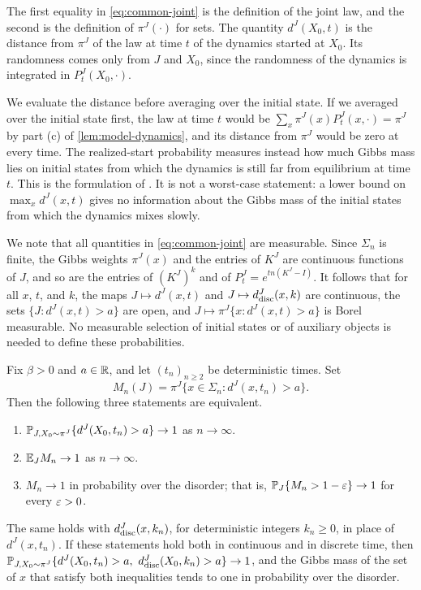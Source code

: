 The first equality in \eqref{eq:common-joint} is the definition of the joint law, and the second is the definition of $\pi^J(\cdot)$ for sets. The quantity $d^J(X_0,t)$ is the distance from $\pi^J$ of the law at time $t$ of the dynamics started at $X_0$. Its randomness comes only from $J$ and $X_0$, since the randomness of the dynamics is integrated in $P_t^J(X_0,\cdot)$.

We evaluate the distance before averaging over the initial state. If we averaged over the initial state first, the law at time $t$ would be $\sum_x\pi^J(x)P^J_t(x,\cdot)=\pi^J$ by part (c) of \cref{lem:model-dynamics}, and its distance from $\pi^J$ would be zero at every time. The realized-start probability measures instead how much Gibbs mass lies on initial states from which the dynamics is still far from equilibrium at time $t$. This is the formulation of \cite[Section~1, following Theorem~1.1, p.~3]{oai-barriers}. It is not a worst-case statement: a lower bound on $\max_xd^J(x,t)$ gives no information about the Gibbs mass of the initial states from which the dynamics mixes slowly.

We note that all quantities in \eqref{eq:common-joint} are measurable. Since $\Sigma_n$ is finite, the Gibbs weights $\pi^J(x)$ and the entries of $K^J$ are continuous functions of $J$, and so are the entries of $(K^J)^k$ and of $P_t^J=e^{tn(K^J-I)}$. It follows that for all $x$, $t$, and $k$, the maps $J\mapsto d^J(x,t)$ and $J\mapsto d^J_{\rm disc}(x,k)$ are continuous, the sets $\{J:d^J(x,t)>a\}$ are open, and $J\mapsto\pi^J\{x:d^J(x,t)>a\}$ is Borel measurable. No measurable selection of initial states or of auxiliary objects is needed to define these probabilities.

\begin{lemma}\label{lem:model-joint}
Fix $\beta>0$ and $a\in\mathbb R$, and let $(t_n)_{n\ge2}$ be deterministic times. Set
\[
 M_n(J)=\pi^J\{x\in\Sigma_n:d^J(x,t_n)>a\}.
\]
Then the following three statements are equivalent.
\begin{enumerate}[label=(\alph*)]
\item $\mathbb P_{J,X_0\sim\pi^J}\{d^J(X_0,t_n)>a\}\to1$ as $n\to\infty$.
\item $\mathbb E_JM_n\to1$ as $n\to\infty$.
\item $M_n\to1$ in probability over the disorder; that is, $\mathbb P_J\{M_n>1-\varepsilon\}\to1$ for every $\varepsilon>0$.
\end{enumerate}
The same holds with $d^J_{\rm disc}(x,k_n)$, for deterministic integers $k_n\ge0$, in place of $d^J(x,t_n)$. If these statements hold both in continuous and in discrete time, then $\PP_{J,X_0\sim\pi^J}\{d^J(X_0,t_n)>a,\ d^J_{\rm disc}(X_0,k_n)>a\}\to1$, and the Gibbs mass of the set of $x$ that satisfy both inequalities tends to one in probability over the disorder.
\end{lemma}

